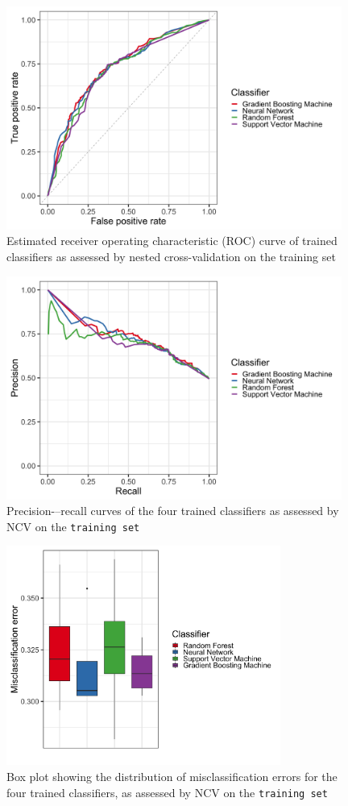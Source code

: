 \begin{figure}[H]
    \centering
    \includegraphics[width=11cm]{pics/BenchmarkROC.png}
    \caption{Estimated receiver operating characteristic (ROC) curve of trained classifiers as assessed by nested cross-validation on the training set \label{fig:OT_ROC}}
\end{figure}

\begin{figure}[H]
    \centering
    \includegraphics[width = 11cm]{pics/BenchmarkPR.png}
    \caption{Precision-–recall curves of the four trained classifiers as assessed by NCV on the \texttt{training set} \label{fig:OT_precisionRecall}}
\end{figure}

\begin{figure}[H]
    \centering
    \includegraphics[width = 9cm]{pics/BenchmarkMmceBoxplots.png}
    \caption{Box plot showing the distribution of misclassification errors for the four trained classifiers, as assessed by NCV on the \texttt{training set} \label{fig:OT_MmceBoxplots}}
\end{figure}

